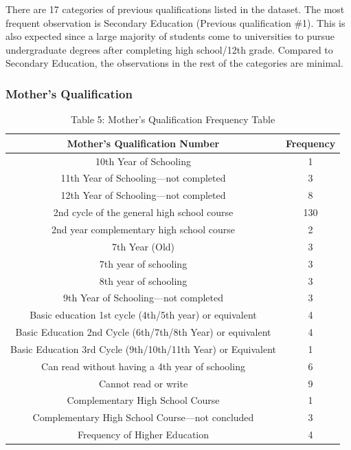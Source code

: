 \documentclass[
]{article}
\begin{document}
There are 17 categories of previous qualifications listed in the
dataset. The most frequent observation is Secondary Education (Previous
qualification \#1). This is also expected since a large majority of
students come to universities to pursue undergraduate degrees after
completing high school/12th grade. Compared to Secondary Education, the
observations in the rest of the categories are minimal.

\hypertarget{mothers-qualification}{%
\subsubsection{Mother's Qualification}\label{mothers-qualification}}

\begin{table}

\caption{\label{tab:unnamed-chunk-10}Table 5: Mother's Qualification Frequency Table}
\centering
\begin{tabular}[t]{c|c}
\hline
Mother's Qualification Number & Frequency\\
\hline
10th Year of Schooling & 1\\
\hline
11th Year of Schooling—not completed & 3\\
\hline
12th Year of Schooling—not completed & 8\\
\hline
2nd cycle of the general high school course & 130\\
\hline
2nd year complementary high school course & 2\\
\hline
7th Year (Old) & 3\\
\hline
7th year of schooling & 3\\
\hline
8th year of schooling & 3\\
\hline
9th Year of Schooling—not completed & 3\\
\hline
Basic education 1st cycle (4th/5th year) or equivalent & 4\\
\hline
Basic Education 2nd Cycle (6th/7th/8th Year) or equivalent & 4\\
\hline
Basic Education 3rd Cycle (9th/10th/11th Year) or Equivalent & 1\\
\hline
Can read without having a 4th year of schooling & 6\\
\hline
Cannot read or write & 9\\
\hline
Complementary High School Course & 1\\
\hline
Complementary High School Course—not concluded & 3\\
\hline
Frequency of Higher Education & 4\\

\end{tabular}
\end{table}
\end{document}
